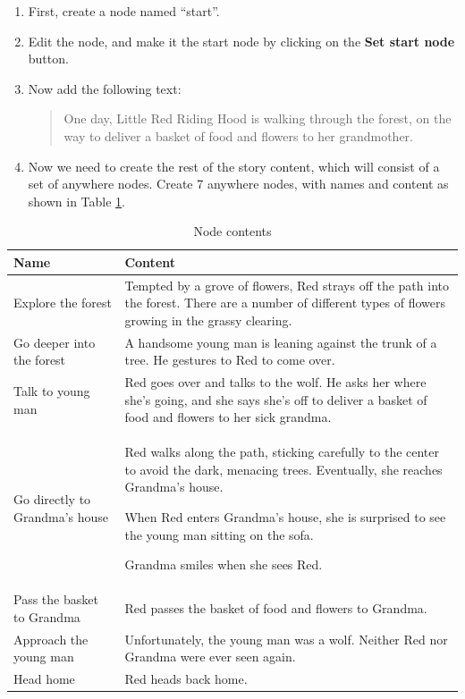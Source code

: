 \documentclass{article}
\begin{document}
\begin{enumerate}
  \item First, create a node named ``start''.
  \item Edit the node, and make it the start node by clicking on the \textbf{Set
  start node} button.
  \item Now add the following text:

\begin{quotation}
\noindent One day, Little Red Riding Hood is walking through the forest, on the
way to deliver a basket of food and flowers to her grandmother. 
\end{quotation}

\item Now we need to create the rest of the story content, which will consist
of a set of anywhere nodes. Create 7 anywhere nodes, with names and content as
shown in Table \ref{table:tut3:node_content}.

\end{enumerate}

\begin{table}[h]
  \centering
  \begin{tabular}{| p{3cm} | p{8cm} |}
    \hline
    Name & Content \\
    \hline
    \hline
    Explore the forest & 
    Tempted by a grove of flowers, Red strays off the path into the forest.
    There are a number of different types of flowers growing in the grassy
    clearing. \\
    \hline
    Go deeper into the forest &
    A handsome young man is leaning against the trunk of a tree. He gestures to
    Red to come over. \\
    \hline
    Talk to young man &
    Red goes over and talks to the wolf. He asks her where she's going, and she
    says she's off to deliver a basket of food and flowers to her sick grandma.
    \\
    \hline
    Go directly to Grandma's house &
    Red walks along the path, sticking carefully to the center to avoid the
    dark, menacing trees. Eventually, she reaches Grandma's house. 
  
    \bigskip
  
    When Red enters Grandma's house, she is surprised to see the young man
    sitting on the sofa.
  
    \bigskip
  
    Grandma smiles when she sees Red. \\
    \hline
    Pass the basket to Grandma &
    Red passes the basket of food and flowers to Grandma. \\
    \hline
    Approach the young man &
    Unfortunately, the young man was a wolf. Neither Red nor Grandma were ever
    seen again. \\
    \hline
    Head home &
    Red heads back home. \\
    \hline
  \end{tabular}
  \caption{Node contents}
  \label{table:tut3:node_content}
\end{table}
\end{document}
